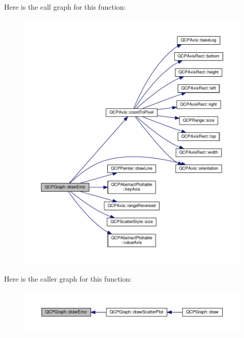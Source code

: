 Here is the call graph for this function\+:\nopagebreak
\begin{figure}[H]
\begin{center}
\leavevmode
\includegraphics[width=350pt]{class_q_c_p_graph_a4df6807066ce877705e999773e7ffbc4_cgraph}
\end{center}
\end{figure}




Here is the caller graph for this function\+:\nopagebreak
\begin{figure}[H]
\begin{center}
\leavevmode
\includegraphics[width=350pt]{class_q_c_p_graph_a4df6807066ce877705e999773e7ffbc4_icgraph}
\end{center}
\end{figure}


\hypertarget{class_q_c_p_graph_ad6d07926e6d6b7cfa70258780d47b7a0}{}
